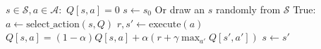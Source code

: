 \documentclass[10pt,oneside]{book}
\begin{document}
\pagestyle{empty}
\thispagestyle{empty}

\begin{codebox}
  \li \For $s \in \mathcal{S}, a \in \mathcal{A}:$
  \li   \Do
          $Q[s, a] = 0$
        \End
  \li $s \gets s_0$ \Comment Or draw an $s$ randomly from $\mathcal S$
  \li \While True:
  \li   \Do
          $a \gets \text{select}\_\text{action}(s, Q)$
  \li     $r,s' \gets \text{execute}(a)$
  \li     $Q[s, a] = (1-\alpha)Q[s, a]
          + \alpha(r + \gamma \max_{a'}Q[s',a'])$
  \li     $s \gets s'$
\end{codebox}
\end{document}
